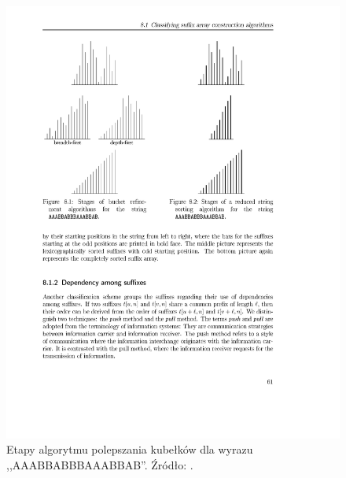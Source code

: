 \begin{figure}[t]
    \begin{center}
        \includegraphics[scale=0.75]{figures/bucket-refinement.pdf}
    \end{center}        

    \caption{Etapy algorytmu polepszania kubełków dla wyrazu
    ,,AAABBABBBAAABBAB''. Źródło: \cite{schurmann-phd}.}%
    \label{rys:bucket-refinement}
\end{figure} 


